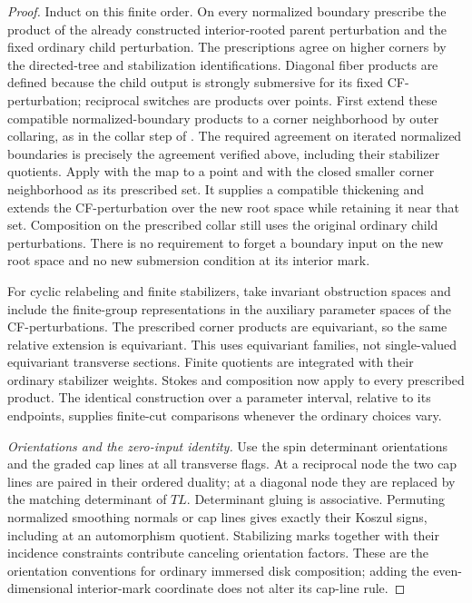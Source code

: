 \begin{proof}
Induct on this finite order.  On every normalized boundary prescribe
the product of the already constructed interior-rooted parent
perturbation and the fixed ordinary child perturbation.  The
prescriptions agree on higher corners by the directed-tree and
stabilization identifications.  Diagonal fiber products are defined
because the child output is strongly submersive for its fixed
CF-perturbation; reciprocal switches are products over points.
First extend these compatible normalized-boundary products to a
corner neighborhood by outer collaring, as in the collar step of
\cite[Proposition~14.8 and Remark~14.7]{AFOOO2026}.  The required
agreement on iterated normalized boundaries is precisely the
agreement verified above, including their stabilizer quotients.
Apply \cite[Proposition~14.5]{AFOOO2026} with the map to a point
and with the closed smaller corner neighborhood as its prescribed
set.  It supplies a compatible thickening and extends the
CF-perturbation over the new root space while retaining it near
that set.  Composition on the prescribed collar still uses the
original ordinary child perturbations.  There is no requirement
to forget a boundary input on the new root space and no new
submersion condition at its interior mark.

For cyclic relabeling and finite stabilizers, take invariant
obstruction spaces and include the finite-group representations in
the auxiliary parameter spaces of the CF-perturbations.  The
prescribed corner products are equivariant, so the same relative
extension is equivariant.  This uses equivariant families, not
single-valued equivariant transverse sections.  Finite quotients
are integrated with their ordinary stabilizer weights.  Stokes and
composition now apply to every prescribed product.  The identical
construction over a parameter interval, relative to its endpoints,
supplies finite-cut comparisons whenever the ordinary choices vary.

\emph{Orientations and the zero-input identity.}
Use the spin determinant orientations and the graded cap lines at
all transverse flags.  At a reciprocal node the two cap lines are
paired in their ordered duality; at a diagonal node they are
replaced by the matching determinant of $TL$.  Determinant gluing
is associative.  Permuting normalized smoothing normals or cap
lines gives exactly their Koszul signs, including at an
automorphism quotient.  Stabilizing marks together with their
incidence constraints contribute canceling orientation factors.
These are the orientation conventions for ordinary immersed disk
composition; adding the even-dimensional interior-mark coordinate
does not alter its cap-line rule.


\end{proof}
